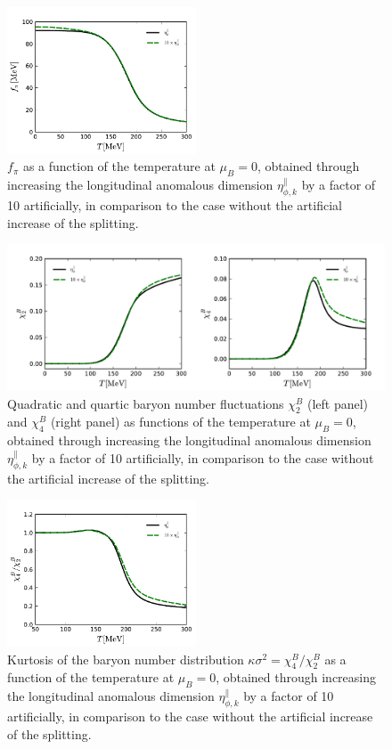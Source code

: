 \documentclass[aps,article,author-year,notitlepage,showpacs]{revtex4-1}
\begin{document}
%
\begin{figure}[htb]
\includegraphics[width=0.5\textwidth]{fpi}
\caption{$f_\pi$ as a function of the temperature at $\mu_B=0$, obtained through increasing the longitudinal anomalous dimension $\eta_{\phi,k}^{\parallel}$ by a factor of 10 artificially, in comparison to the case without the artificial increase of the splitting.}\label{fig:fpi}
\end{figure}
%

%
\begin{figure}[htb]
\includegraphics[width=1.\textwidth]{chi}
\caption{Quadratic and quartic baryon number fluctuations $\chi_2^B$ (left panel) and $\chi_4^B$ (right panel) as functions of the temperature at $\mu_B=0$, obtained through increasing the longitudinal anomalous dimension $\eta_{\phi,k}^{\parallel}$ by a factor of 10 artificially, in comparison to the case without the artificial increase of the splitting.}\label{fig:chi}
\end{figure}
%

%
\begin{figure}[htb]
\includegraphics[width=0.5\textwidth]{kur}
\caption{Kurtosis of the baryon number distribution $\kappa \sigma^2=\chi_4^{B}/\chi_2^{B}$ as a function of the temperature at $\mu_B=0$, obtained through increasing the longitudinal anomalous dimension $\eta_{\phi,k}^{\parallel}$ by a factor of 10 artificially, in comparison to the case without the artificial increase of the splitting.}\label{fig:kur}
\end{figure}
%
\end{document}
